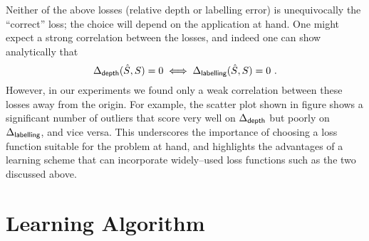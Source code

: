 Neither of the above losses (relative depth or labelling error) is
unequivocally the ``correct'' loss; the choice will depend on the
application at hand. One might expect a strong correlation between the
losses, and indeed one can show analytically that
\begin{equation}
  \DepthLoss(\EstSeam,\Seam) = 0
  \iff
  \LblLoss(\EstSeam,\Seam) = 0 ~.
\end{equation}
However, in our experiments we found only a weak correlation between
these losses away from the origin. For example, the scatter plot shown
in figure  shows a significant number of
outliers that score very well on $\DepthLoss$ but poorly on
$\LblLoss$, and vice versa. This underscores the importance of
choosing a loss function suitable for the problem at hand, and
highlights the advantages of a learning scheme that can incorporate
widely--used loss functions such as the two discussed above.

\section{Learning Algorithm}
\label{sec:learning}


